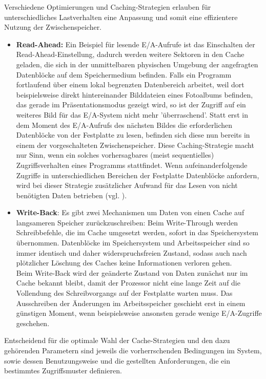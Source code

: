 \documentclass[
	12pt,
	a4paper,
	BCOR10mm,
	DIV14,
	listof=totoc,
	bibliography=totoc,
	headsepline
]{scrreprt}
\begin{document}
Verschiedene Optimierungen und Caching-Strategien erlauben für unterschiedliches Lastverhalten eine Anpassung und somit eine effizientere Nutzung der Zwischenspeicher.
\begin{itemize}
\item \textbf{Read-Ahead:} Ein Beispiel für lesende E/A-Aufrufe ist das Einschalten der Read-Ahead-Einstellung, dadurch werden weitere Sektoren in den Cache geladen, die sich in der unmittelbaren physischen Umgebung der angefragten Datenblöcke auf dem  Speichermedium befinden. Falls ein Programm fortlaufend über einem lokal begrenzten Datenbereich arbeitet, weil dort beispielsweise direkt hintereinander Bilddateien eines Fotoalbums befinden, das gerade im Präsentationsmodus gezeigt wird, so ist der Zugriff auf ein weiteres Bild für das E/A-System nicht mehr 'überraschend'. Statt erst in dem Moment des E/A-Aufrufs des nächsten Bildes die erforderlichen Datenblöcke von der Festplatte zu lesen, befinden sich diese nun bereits in einem der vorgeschalteten Zwischenspeicher. Diese Caching-Strategie macht nur Sinn, wenn ein solches vorhersagbares (meist sequentielles) Zugriffsverhalten eines Programms stattfindet. 
Wenn aufeinanderfolgende Zugriffe in unterschiedlichen Bereichen der Festplatte Datenblöcke anfordern, wird bei dieser Strategie zusätzlicher Aufwand für das Lesen von nicht benötigten Daten betrieben (vgl. \cite{corbet2015}). 
\item \textbf{Write-Back}: Es gibt zwei Mechanismen um Daten von einen Cache auf langsameren Speicher zurückzuschreiben:
Beim Write-Through werden Schreibbefehle, die im Cache umgesetzt werden, sofort in das Speichersystem übernommen. Datenblöcke im Speichersystem und Arbeitsspeicher sind so immer identisch und daher widerspruchsfreien Zustand, sodass auch nach plötzlicher Löschung des Caches keine Informationen verloren gehen.\\
Beim Write-Back wird der geänderte Zustand von Daten zunächst nur im Cache bekannt bleibt, damit der Prozessor nicht eine lange Zeit auf die Vollendung des Schreibvorgangs auf der Festplatte warten muss. Das Ausschreiben der Änderungen im Arbeitsspeicher geschieht erst in einem günstigen Moment, wenn beispielsweise ansonsten gerade wenige E/A-Zugriffe geschehen.
\end{itemize}
Entscheidend für die optimale Wahl der Cache-Strategien und den dazu gehörenden Parametern sind jeweils die vorherrschenden Bedingungen im System, sowie dessen Benutzungsweise und die gestellten Anforderungen, die ein bestimmtes Zugriffsmuster definieren.
\end{document}
